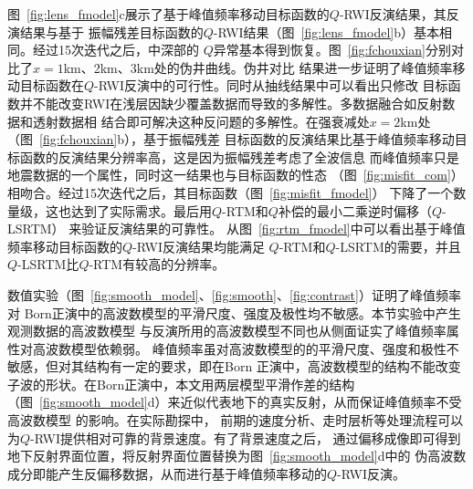 图~\ref{fig:lens_fmodel}c展示了基于峰值频率移动目标函数的$Q$-RWI反演结果，其反演结果与基于
振幅残差目标函数的$Q$-RWI结果（图~\ref{fig:lens_fmodel}b）基本相同。经过15次迭代之后，中深部的
$Q$异常基本得到恢复。图~\ref{fig:fchouxian}分别对比了$x=1$km、2km、3km处的伪井曲线。伪井对比
结果进一步证明了峰值频率移动目标函数在$Q$-RWI反演中的可行性。同时从抽线结果中可以看出只修改
目标函数并不能改变RWI在浅层因缺少覆盖数据而导致的多解性。多数据融合如反射数据和透射数据相
结合即可解决这种反问题的多解性。在强衰减处$x=2$km处（图~\ref{fig:fchouxian}b），基于振幅残差
目标函数的反演结果比基于峰值频率移动目标函数的反演结果分辨率高，这是因为振幅残差考虑了全波信息
而峰值频率只是地震数据的一个属性，同时这一结果也与目标函数的性态
（图~\ref{fig:misfit_com}）相吻合。经过15次迭代之后，其目标函数（图~\ref{fig:misfit_fmodel}）
下降了一个数量级，这也达到了实际需求。最后用$Q$-RTM和$Q$补偿的最小二乘逆时偏移（$Q$-LSRTM）
来验证反演结果的可靠性。
从图~\ref{fig:rtm_fmodel}中可以看出基于峰值频率移动目标函数的$Q$-RWI反演结果均能满足
$Q$-RTM和$Q$-LSRTM的需要，并且$Q$-LSRTM比$Q$-RTM有较高的分辨率。

数值实验（图~\ref{fig:smooth_model}、\ref{fig:smooth}、\ref{fig:contrast}）证明了峰值频率对
Born正演中的高波数模型的平滑尺度、强度及极性均不敏感。本节实验中产生观测数据的高波数模型
与反演所用的高波数模型不同也从侧面证实了峰值频率属性对高波数模型依赖弱。
峰值频率虽对高波数模型的的平滑尺度、强度和极性不敏感，但对其结构有一定的要求，即在Born
正演中，高波数模型的结构不能改变子波的形状。在Born正演中，本文用两层模型平滑作差的结构
（图~\ref{fig:smooth_model}d）来近似代表地下的真实反射，从而保证峰值频率不受高波数模型
的影响。在实际勘探中，
前期的速度分析、走时层析等处理流程可以为$Q$-RWI提供相对可靠的背景速度。有了背景速度之后，
通过偏移成像即可得到地下反射界面位置，将反射界面位置替换为图~\ref{fig:smooth_model}d中的
伪高波数成分即能产生反偏移数据，从而进行基于峰值频率移动的$Q$-RWI反演。

